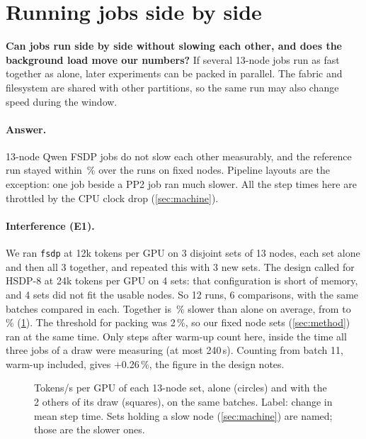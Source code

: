 \section{Running jobs side by side}
\label{sec:interference}

\begin{question}
  \textbf{Can jobs run side by side without slowing each other, and does the background load move our
  numbers?} If several 13-node jobs run as fast together as alone, later experiments can be packed in
  parallel. The fabric and filesystem are shared with other partitions, so the same run may also change
  speed during the window.
\end{question}

\paragraph{Answer.} 13-node Qwen FSDP jobs do not slow each other measurably, and the reference run stayed within \TriRefSpreadPct\,\% over the \TriRefRuns{} runs on fixed nodes. Pipeline layouts are the exception: one job beside a PP2 job ran much slower. All the step times here are throttled by the CPU clock drop (\cref{sec:machine}).

\paragraph{Interference (E1).} We ran \texttt{fsdp} at 12k tokens per GPU on 3 disjoint sets of 13 nodes, each set alone and then all 3 together, and repeated this with 3 new sets. The design called for HSDP-8 at 24k tokens per GPU on 4 sets: that configuration is short of memory, and 4 sets did not fit the usable nodes. So 12 runs, 6 comparisons, with
the same batches compared in each. Together is \TriInterferencePct\,\% slower than alone on average, from \TriInterferenceLo{} to \TriInterferenceHi\,\% (\cref{fig:interference}). The threshold for packing was 2\,\%, so our fixed node sets (\cref{sec:method}) ran at the same time. Only steps after warm-up count here, inside the time all three jobs of a draw were measuring (at most 240\,s). Counting from batch 11, warm-up included, gives +0.26\,\%, the figure in the design notes.

\begin{figure}[h]
  \centering{}
  \caption{Tokens/s per GPU of each 13-node set, alone (circles) and with the 2 others of its draw (squares), on the same batches. Label: change in mean step time. Sets holding a slow node (\cref{sec:machine}) are named; those are the slower ones. }
  \label{fig:interference}
\end{figure}

